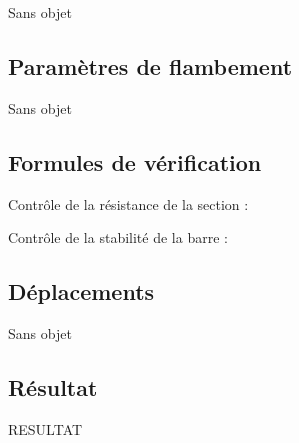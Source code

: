 Sans objet

\subsection{Paramètres de flambement}

Sans objet

\subsection{Formules de vérification}

Contrôle de la résistance de la section :

Contrôle de la stabilité de la barre :

\subsection{Déplacements}

Sans objet

\subsection{Résultat}

RESULTAT
